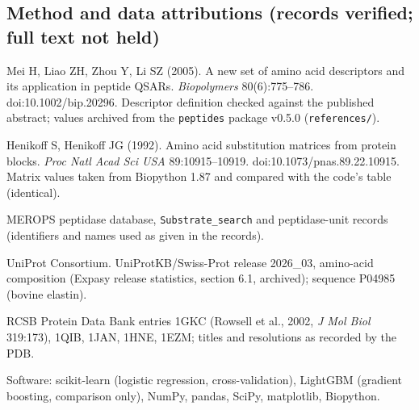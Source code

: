 \subsection*{Method and data attributions (records verified; full text not held)}
\begin{enumerate}[label={[M\arabic*]},leftmargin=*,itemsep=0.2em]
\item Mei H, Liao ZH, Zhou Y, Li SZ (2005). A new set of amino acid descriptors and its application in peptide QSARs. \textit{Biopolymers} 80(6):775--786. doi:10.1002/bip.20296. Descriptor definition checked against the published abstract; values archived from the \texttt{peptides} package v0.5.0 (\texttt{references/}).
\item Henikoff S, Henikoff JG (1992). Amino acid substitution matrices from protein blocks. \textit{Proc Natl Acad Sci USA} 89:10915--10919. doi:10.1073/pnas.89.22.10915. Matrix values taken from Biopython 1.87 and compared with the code's table (identical).
\item MEROPS peptidase database, \texttt{Substrate\_search} and peptidase-unit records (identifiers and names used as given in the records).
\item UniProt Consortium. UniProtKB/Swiss-Prot release 2026\_03, amino-acid composition (Expasy release statistics, section 6.1, archived); sequence P04985 (bovine elastin).
\item RCSB Protein Data Bank entries 1GKC (Rowsell et al., 2002, \textit{J Mol Biol} 319:173), 1QIB, 1JAN, 1HNE, 1EZM; titles and resolutions as recorded by the PDB.
\item Software: scikit-learn (logistic regression, cross-validation), LightGBM (gradient boosting, comparison only), NumPy, pandas, SciPy, matplotlib, Biopython.
\end{enumerate}
